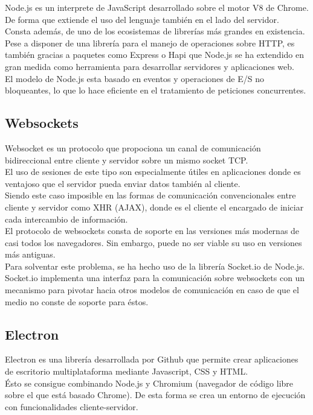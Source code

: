 Node.js es un interprete de JavaScript desarrollado sobre el motor V8 de Chrome. De forma que extiende el uso del lenguaje también en el lado del servidor. \\
Consta además, de uno de los ecosistemas de librerías más grandes en existencia. \\

Pese a disponer de una librería para el manejo de operaciones sobre HTTP, es también gracias a paquetes como Express o Hapi que Node.js se ha extendido en gran medida como herramienta para desarrollar servidores y aplicaciones web. \\
El modelo de Node.js esta basado en eventos y operaciones de E/S no bloqueantes, lo que lo hace eficiente en el tratamiento de peticiones concurrentes.

\subsection {Websockets}

Websocket es un protocolo que propociona un canal de comunicación bidireccional entre cliente y servidor sobre un mismo socket TCP. \\
El uso de sesiones de este tipo son especialmente útiles en aplicaciones donde es ventajoso que el servidor pueda enviar datos también al cliente. \\
Siendo este caso imposible en las formas de comunicación convencionales entre cliente y servidor como XHR (AJAX), donde es el cliente el encargado de iniciar cada intercambio de información. \\

El protocolo de websockets consta de soporte en las versiones más modernas de casi todos los navegadores. Sin embargo, puede no ser viable su uso en versiones más antiguas. \\

Para solventar este problema, se ha hecho uso de la librería Socket.io de Node.js. \\ 
Socket.io implementa una interfaz para la comunicación sobre websockets con un mecanismo para pivotar hacia otros modelos de comunicación en caso de que el medio no conste de soporte para éstos. \\
\subsection {Electron}

Electron es una librería desarrollada por Github que permite crear aplicaciones de escritorio multiplataforma mediante Javascript, CSS y HTML. \\
Ésto se consigue combinando Node.js y Chromium (navegador de código libre sobre el que está basado Chrome). De esta forma se crea un entorno de ejecución con funcionalidades cliente-servidor. \\

